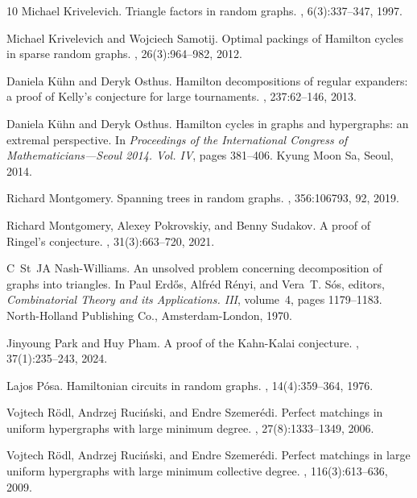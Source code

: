 \documentclass[11pt]{article}
\numberwithin{equation}{section}
\newcounter{i}
\theoremstyle{plain}
\theoremstyle{plain} %
\theoremstyle{definition}
\begin{document}
\begin{thebibliography}{10}
Michael Krivelevich.
\newblock Triangle factors in random graphs.
, 6(3):337--347, 1997.

Michael Krivelevich and Wojciech Samotij.
\newblock Optimal packings of {H}amilton cycles in sparse random graphs.
, 26(3):964--982, 2012.

Daniela K\"{u}hn and Deryk Osthus.
\newblock Hamilton decompositions of regular expanders: a proof of {K}elly's
  conjecture for large tournaments.
, 237:62--146, 2013.

Daniela K\"{u}hn and Deryk Osthus.
\newblock Hamilton cycles in graphs and hypergraphs: an extremal perspective.
\newblock In {\em Proceedings of the {I}nternational {C}ongress of
  {M}athematicians---{S}eoul 2014. {V}ol. {IV}}, pages 381--406. Kyung Moon Sa,
  Seoul, 2014.

Richard Montgomery.
\newblock Spanning trees in random graphs.
, 356:106793, 92, 2019.

Richard Montgomery, Alexey Pokrovskiy, and Benny Sudakov.
\newblock A proof of {R}ingel's conjecture.
, 31(3):663--720, 2021.

C~St~JA Nash-Williams.
\newblock An unsolved problem concerning decomposition of graphs into
  triangles.
\newblock In Paul Erd\H{o}s, Alfr\'{e}d R\'{e}nyi, and Vera~T. S\'{o}s,
  editors, {\em Combinatorial Theory and its Applications. {III}}, volume~4,
  pages 1179--1183. North-Holland Publishing Co., Amsterdam-London, 1970.

Jinyoung Park and Huy Pham.
\newblock A proof of the {K}ahn-{K}alai conjecture.
, 37(1):235--243, 2024.

Lajos P\'{o}sa.
\newblock Hamiltonian circuits in random graphs.
, 14(4):359--364, 1976.

Vojtech R\"{o}dl, Andrzej Ruci\'{n}ski, and Endre Szemer\'{e}di.
\newblock Perfect matchings in uniform hypergraphs with large minimum degree.
, 27(8):1333--1349, 2006.

Vojtech R\"{o}dl, Andrzej Ruci\'{n}ski, and Endre Szemer\'{e}di.
\newblock Perfect matchings in large uniform hypergraphs with large minimum
  collective degree.
, 116(3):613--636, 2009.


\end{thebibliography}
\end{document}
